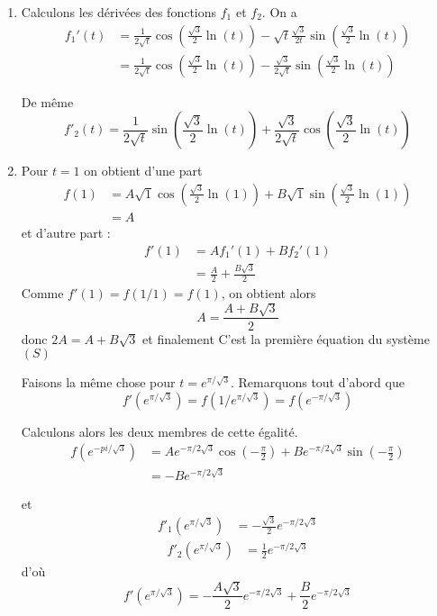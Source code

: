 \documentclass[a4paper, 11pt,reqno]{article}
\begin{document}
\begin{correction}
\begin{enumerate}
\item Calculons les dérivées des fonctions $f_1$ et $f_2$. 
On a 
\begin{align*}
f_1'(t) &= \frac{1}{2\sqrt{t}}  \cos\left(\frac{\sqrt{3}}{2}\ln(t)\right)  - \sqrt{t} \frac{\sqrt{3}}{2t} \sin\left(\frac{\sqrt{3}}{2}\ln(t)\right)\\
&= \frac{1}{2\sqrt{t}}  \cos\left(\frac{\sqrt{3}}{2}\ln(t)\right)  - \frac{\sqrt{3}}{2\sqrt{t} } \sin\left(\frac{\sqrt{3}}{2}\ln(t)\right)
\end{align*}

De même 
$$f'_2(t)= \frac{1}{2\sqrt{t}}  \sin\left(\frac{\sqrt{3}}{2}\ln(t)\right)  + \frac{\sqrt{3}}{2\sqrt{t} } \cos\left(\frac{\sqrt{3}}{2}\ln(t)\right)$$

\item Pour $t= 1$ on obtient d'une part 
\begin{align*}
f(1)& = A \sqrt{1}  \cos\left(\frac{\sqrt{3}}{2}\ln(1)\right) +B\sqrt{1}  \sin\left(\frac{\sqrt{3}}{2}\ln(1)\right)\\
&=A
\end{align*}
et  d'autre part : 
\begin{align*}
f'(1) &= Af_1'(1) +  Bf_2'(1)\\
		&= \frac{A}{2} + \frac{B\sqrt{3}}{2}
\end{align*}
Comme $f'(1) =f(1/1)=f(1)$,
on obtient alors 
$$A= \frac{A+B\sqrt{3}}{2}$$
donc 
$2A=A+B\sqrt{3} $ et finalement 
C'est la première équation du système $(S)$


Faisons la même chose pour $t=e^{\pi/\sqrt{3}}$. Remarquons tout d'abord que 
$$f'(e^{\pi/\sqrt{3}}) = f(1/e^{\pi/\sqrt{3}}) = f(e^{-\pi/\sqrt{3}})$$

Calculons alors les deux membres de cette égalité. 
\begin{align*}
f(e^{-pi/\sqrt{3}}) &=Ae^{-\pi/2\sqrt{3}}  \cos( -\frac{\pi}{2})+Be^{-\pi/2\sqrt{3}}  \sin( -\frac{\pi}{2})\\
&=-B e^{-\pi/2\sqrt{3}} 
\end{align*}

et
\begin{align*}
 f'_1(e^{\pi/\sqrt{3}})&= -\frac{\sqrt{3}}{2}e^{-\pi/2\sqrt{3}}
\end{align*}
\begin{align*}
 f'_2(e^{\pi/\sqrt{3}})&= \frac{1}{2}e^{-\pi/2\sqrt{3}}
\end{align*}
d'où 
$$f'(e^{\pi/\sqrt{3}}) =  -\frac{A\sqrt{3}}{2}e^{-\pi/2\sqrt{3}}+ \frac{B}{2}e^{-\pi/2\sqrt{3}}$$


\end{enumerate}
\end{correction}
\end{document}
